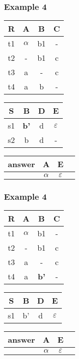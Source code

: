 \documentclass{beamer}
\begin{document}
\begin{frame}
  \frametitle{Example 4}

  \begin{tabular}{ c | c c c}
  R & A & B & C \\
  \hline
  t1 & $\alpha$  & b1  & - \\
  t2 & -  & b1  & c \\
  t3 & a & - & c \\
  t4 & a  & b & - \\
  \end{tabular}
   \begin{tabular}{ c | c c c}
  S & B & D & E \\
  \hline
  s1 & \textbf{b'}  & d  & $\varepsilon$ \\
  s2 & b  & d  & - \\
  \end{tabular}
  \begin{tabular}{ c | c c c}
  answer & A & E \\
  \hline
   & $\alpha$& $\varepsilon$\\
  \end{tabular}
\end{frame}

\begin{frame}
  \frametitle{Example 4}

  \begin{tabular}{ c | c c c}
  R & A & B & C \\
  \hline
  t1 & $\alpha$  & b1  & - \\
  t2 & -  & b1  & c \\
  t3 & a & - & c \\
  t4 & a  & \textbf{b'} & - \\
  \end{tabular}
   \begin{tabular}{ c | c c c}
  S & B & D & E \\
  \hline
  s1 & b'  & d  & $\varepsilon$ \\
  \end{tabular}
  \begin{tabular}{ c | c c c}
  answer & A & E \\
  \hline
   & $\alpha$& $\varepsilon$\\
  \end{tabular}
\end{frame}
\end{document}
